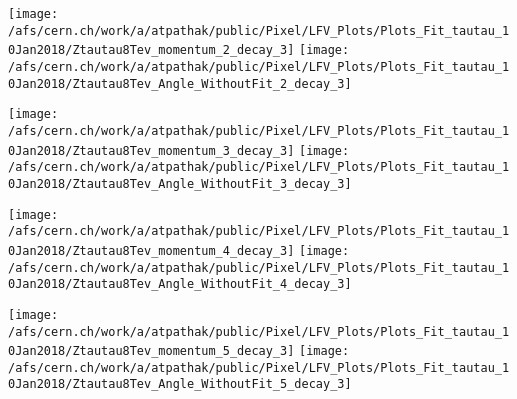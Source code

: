 \documentclass{beamer}
\begin{document}
\begin{frame}
\begin{normalsize}
\begin{center}
\texttt{[image: /afs/cern.ch/work/a/atpathak/public/Pixel/LFV\_Plots/Plots\_Fit\_tautau\_10Jan2018/Ztautau8Tev\_momentum\_2\_decay\_3]}
\texttt{[image: /afs/cern.ch/work/a/atpathak/public/Pixel/LFV\_Plots/Plots\_Fit\_tautau\_10Jan2018/Ztautau8Tev\_Angle\_WithoutFit\_2\_decay\_3]} 
\end{center}
\end{normalsize}
\end {frame}
\begin{frame}
\begin{normalsize}
\begin{center}
\texttt{[image: /afs/cern.ch/work/a/atpathak/public/Pixel/LFV\_Plots/Plots\_Fit\_tautau\_10Jan2018/Ztautau8Tev\_momentum\_3\_decay\_3]}
\texttt{[image: /afs/cern.ch/work/a/atpathak/public/Pixel/LFV\_Plots/Plots\_Fit\_tautau\_10Jan2018/Ztautau8Tev\_Angle\_WithoutFit\_3\_decay\_3]} 
\end{center}
\end{normalsize}
\end {frame}
\begin{frame}
\begin{normalsize}
\begin{center}
\texttt{[image: /afs/cern.ch/work/a/atpathak/public/Pixel/LFV\_Plots/Plots\_Fit\_tautau\_10Jan2018/Ztautau8Tev\_momentum\_4\_decay\_3]}
\texttt{[image: /afs/cern.ch/work/a/atpathak/public/Pixel/LFV\_Plots/Plots\_Fit\_tautau\_10Jan2018/Ztautau8Tev\_Angle\_WithoutFit\_4\_decay\_3]} 
\end{center}
\end{normalsize}
\end {frame}
\begin{frame}
\begin{normalsize}
\begin{center}
\texttt{[image: /afs/cern.ch/work/a/atpathak/public/Pixel/LFV\_Plots/Plots\_Fit\_tautau\_10Jan2018/Ztautau8Tev\_momentum\_5\_decay\_3]}
\texttt{[image: /afs/cern.ch/work/a/atpathak/public/Pixel/LFV\_Plots/Plots\_Fit\_tautau\_10Jan2018/Ztautau8Tev\_Angle\_WithoutFit\_5\_decay\_3]} 
\end{center}
\end{normalsize}
\end {frame}
\end{document}
